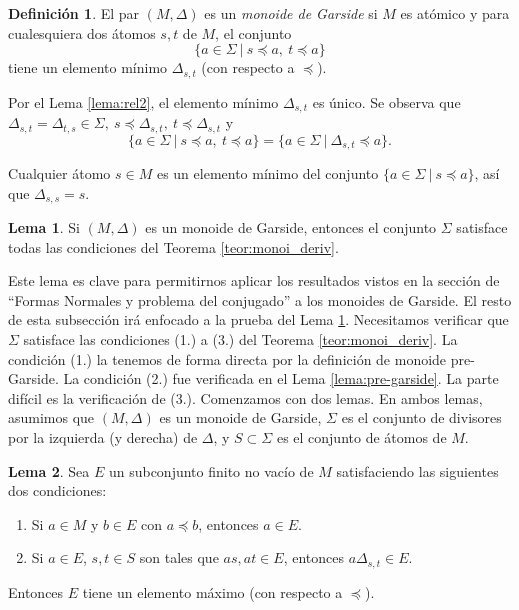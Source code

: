 \documentclass[12pt]{book}
\theoremstyle{definition}
\newtheorem{defi}{Definición}[section]
\newtheorem{lema}{Lema}[section]
\begin{document}
\begin{defi}
El par $(M,\Delta)$ es un \textit{monoide de Garside} si $M$ es atómico y para cualesquiera dos átomos $s,t$ de $M$, el conjunto
$$\{a\in\Sigma\ |\ s\preceq a,\ t\preceq a \}$$
tiene un elemento mínimo $\Delta_{s,t}$ (con respecto a $\preceq$).

Por el Lema \ref{lema:rel2}, el elemento mínimo $\Delta_{s,t}$ es único. Se observa que $\Delta_{s,t}=\Delta_{t,s}\in\Sigma,\ s\preceq\Delta_{s,t},\ t\preceq\Delta_{s,t}$ y 
$$\{a\in\Sigma\ |\ s\preceq a,\ t\preceq a \}=\{a\in\Sigma\ |\ \Delta_{s,t}\preceq a\}.$$

Cualquier átomo $s\in M$ es un elemento mínimo del conjunto $\{a\in\Sigma\ |\ s\preceq a\}$, así que $\Delta_{s,s}=s$.
\label{defi:garside}
\end{defi}

\begin{lema}
Si $(M,\Delta)$ es un monoide de Garside, entonces el conjunto $\Sigma$ satisface todas las condiciones del Teorema \ref{teor:monoi_deriv}.
\label{lema:garside}
\end{lema}

Este lema es clave para permitirnos aplicar los resultados vistos en la sección de ``Formas Normales y problema del conjugado'' a los monoides de Garside. El resto de esta subsección irá enfocado a la prueba del Lema \ref{lema:garside}. Necesitamos verificar que $\Sigma$ satisface las condiciones (1.) a (3.) del Teorema \ref{teor:monoi_deriv}. La condición (1.) la tenemos de forma directa por la definición de monoide pre-Garside. La condición (2.) fue verificada en el Lema \ref{lema:pre-garside}. La parte difícil es la verificación de (3.). Comenzamos con dos lemas. En ambos lemas, asumimos que $(M,\Delta)$ es un monoide de Garside, $\Sigma$ es el conjunto de divisores por la izquierda (y derecha) de $\Delta$, y $S\subset \Sigma$ es el conjunto de átomos de $M$.

\begin{lema}
Sea $E$ un subconjunto finito no vacío de $M$ satisfaciendo las siguientes dos condiciones:
\begin{enumerate}[label=(\roman*).]
\item Si $a\in M$ y $b\in E$ con $a\preceq b$, entonces $a\in E$.
\item Si $a\in E$, $s,t\in S$ son tales que $as,at\in E$, entonces $a\Delta_{s,t}\in E$.
\end{enumerate}
Entonces $E$ tiene un elemento máximo (con respecto a $\preceq$).
\label{lema:garside1}
\end{lema}
\end{document}
